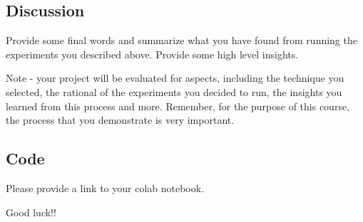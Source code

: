\documentclass{article}
\begin{document}
\subsection{Discussion}
Provide some final words and summarize what you have found from running the experiments you described above. Provide some high level insights.

Note - your project will be evaluated for aspects, including the technique you selected, the rational of the experiments you decided to run, the insights you learned from this process and more. Remember, for the purpose of this course, the process that you demonstrate is very  important.

\subsection{Code}

Please provide a link to your colab notebook.

Good luck!!


\end{document}
